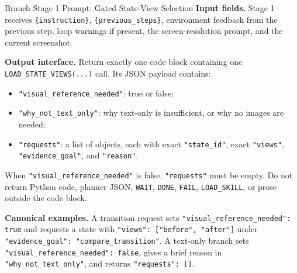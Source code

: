 \documentclass{llmxive}
\begin{document}
\begin{promptbox}{Branch Stage 1 Prompt: Gated State-View Selection}
\medskip
\textbf{Input fields.} Stage 1 receives \texttt{\{instruction\}}, \texttt{\{previous\_steps\}}, environment feedback from the previous step, loop warnings if present, the screen-resolution prompt, and the current screenshot.

\medskip
\textbf{Output interface.} Return exactly one code block containing one \texttt{LOAD\_STATE\_VIEWS(...)} call. Its JSON payload contains:
\begin{itemize}[leftmargin=*, itemsep=0.2em]
    \item \texttt{"visual\_reference\_needed"}: true or false;
    \item \texttt{"why\_not\_text\_only"}: why text-only is insufficient, or why no images are needed;
    \item \texttt{"requests"}: a list of objects, each with exact \texttt{"state\_id"}, exact \texttt{"views"}, \texttt{"evidence\_goal"}, and \texttt{"reason"}.
\end{itemize}
When \texttt{"visual\_reference\_needed"} is false, \texttt{"requests"} must be empty. Do not return Python code, planner JSON, \texttt{WAIT}, \texttt{DONE}, \texttt{FAIL}, \texttt{LOAD\_SKILL}, or prose outside the code block.

\medskip
\textbf{Canonical examples.} A transition request sets \texttt{"visual\_reference\_needed": true} and requests a state with \texttt{"views": ["before", "after"]} under \texttt{"evidence\_goal": "compare\_transition"}. A text-only branch sets \texttt{"visual\_reference\_needed": false}, gives a brief reason in \texttt{"why\_not\_text\_only"}, and returns \texttt{"requests": []}.
\end{promptbox}
\end{document}
